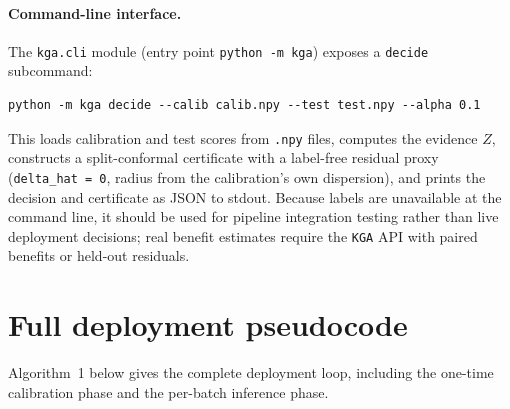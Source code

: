 \paragraph{Command-line interface.}
The \texttt{kga.cli} module (entry point \texttt{python -m kga}) exposes a
\texttt{decide} subcommand:

\begin{verbatim}
python -m kga decide --calib calib.npy --test test.npy --alpha 0.1
\end{verbatim}

This loads calibration and test scores from \texttt{.npy} files, computes the
evidence $Z$, constructs a split-conformal certificate with a label-free
residual proxy (\texttt{delta\_hat = 0}, radius from the calibration's own
dispersion), and prints the decision and certificate as JSON to stdout.  Because
labels are unavailable at the command line, it should be used for pipeline
integration testing rather than live deployment decisions; real benefit estimates
require the \texttt{KGA} API with paired benefits or held-out residuals.

\section{Full deployment pseudocode}
\label{sec:kga-pseudocode}

Algorithm~1 below gives the complete deployment loop, including the one-time
calibration phase and the per-batch inference phase.


